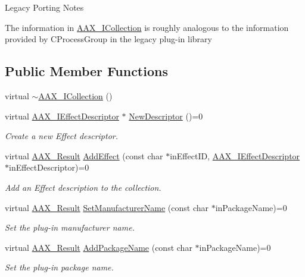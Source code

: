 \begin{DoxyRefDesc}{Legacy Porting Notes}
\item[\hyperlink{a00384__porting_notes000037}{Legacy Porting Notes}]The information in \hyperlink{a00087}{A\+A\+X\+\_\+\+I\+Collection} is roughly analogous to the information provided by C\+Process\+Group in the legacy plug-\/in library\end{DoxyRefDesc}
\subsection*{Public Member Functions}
\begin{DoxyCompactItemize}
\item 
virtual \hyperlink{a00087_a830a9afde909fafd772f2d935a78e337}{$\sim$\+A\+A\+X\+\_\+\+I\+Collection} ()
\item 
virtual \hyperlink{a00096}{A\+A\+X\+\_\+\+I\+Effect\+Descriptor} $\ast$ \hyperlink{a00087_afab70588134a065a5b4d6ea6ddd5ddff}{New\+Descriptor} ()=0
\begin{DoxyCompactList}\small\item\em Create a new Effect descriptor. \end{DoxyCompactList}\item 
virtual \hyperlink{a00149_a4d8f69a697df7f70c3a8e9b8ee130d2f}{A\+A\+X\+\_\+\+Result} \hyperlink{a00087_a5ff114b8c4da2081515186f2faf65c8c}{Add\+Effect} (const char $\ast$in\+Effect\+I\+D, \hyperlink{a00096}{A\+A\+X\+\_\+\+I\+Effect\+Descriptor} $\ast$in\+Effect\+Descriptor)=0
\begin{DoxyCompactList}\small\item\em Add an Effect description to the collection. \end{DoxyCompactList}\item 
virtual \hyperlink{a00149_a4d8f69a697df7f70c3a8e9b8ee130d2f}{A\+A\+X\+\_\+\+Result} \hyperlink{a00087_a7fbeab9630460b9bf4525512609855f0}{Set\+Manufacturer\+Name} (const char $\ast$in\+Package\+Name)=0
\begin{DoxyCompactList}\small\item\em Set the plug-\/in manufacturer name. \end{DoxyCompactList}\item 
virtual \hyperlink{a00149_a4d8f69a697df7f70c3a8e9b8ee130d2f}{A\+A\+X\+\_\+\+Result} \hyperlink{a00087_acf7410e0d06cf64bea36bf7d18b3456c}{Add\+Package\+Name} (const char $\ast$in\+Package\+Name)=0
\begin{DoxyCompactList}\small\item\em Set the plug-\/in package name. \end{DoxyCompactList}\item 

\end{DoxyCompactItemize}
